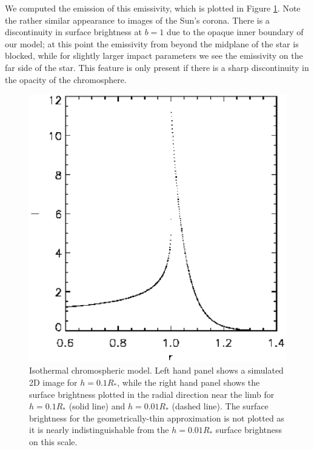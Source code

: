 \documentclass[manuscript]{aastex}
\begin{document}
We computed the emission of this emissivity, which is plotted in
Figure \ref{fig03}.  Note the rather similar appearance to images of
the Sun's corona.  There is a discontinuity in surface brightness at
$b=1$ due to the opaque inner boundary of our model; at this point the
emissivity from beyond the midplane of the star is blocked, while for
slightly larger impact parameters we see the emissivity on the far
side of the star.  This feature is only present if there is a sharp
discontinuity in the opacity of the chromosphere.

\begin{figure}
\includegraphics[width=\textwidth]{chromosphere_surface_brightness.eps}
\caption{Isothermal chromospheric model. Left hand panel shows a simulated 2D
image for $h=0.1R_*$, while the right hand panel shows the
surface brightness plotted in the radial direction near
the limb for $h=0.1R_*$ (solid line) and $h=0.01R_*$
(dashed line).  The surface brightness for the geometrically-thin
approximation is not plotted as it is nearly indistinguishable from 
the $h=0.01R_*$ surface brightness on this scale.}
\label{fig03}
\end{figure}
\end{document}
